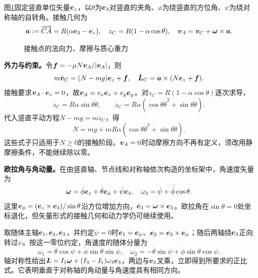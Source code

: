 \begin{solution}
图\ref{fig:hw6-8-s}固定竖直单位矢量$\bm{e}_z$，以$\theta$为$\bm{e}_3$对竖直的夹角、$\phi$为绕竖直的方位角、$\psi$为绕对称轴的自转角。接触几何为
\[
 \bm{a}:=\overrightarrow{CA}=R(\alpha\bm{e}_3-\bm{e}_z),\quad
 z_C=R(1-\alpha\cos\theta),\quad \bm{v}_A=\bm{v}_C+\bm{\omega}\times\bm{a}.
\]

\begin{figure}[H]\centering
{}
\caption{接触点的法向力、摩擦与质心重力}\label{fig:hw6-8-s}
\end{figure}

\textbf{外力与约束。}令$\bm{f}=-\mu N\bm{v}_A/|\bm{v}_A|$，则
\[
 m\dot{\bm{v}}_C=(N-mg)\bm{e}_z+\bm{f},\quad
 \dot{\bm{L}}_C=\bm{a}\times(N\bm{e}_z+\bm{f}).
\]
接触要求$\bm{v}_A\cdot\bm{e}_z=0$，故$\bm{v}_A=v_x\bm{e}_x+v_y\bm{e}_y$。对$z_C=R(1-\alpha\cos\theta)$逐次求导，
\[
\dot z_C=R\alpha\sin\theta\dot\theta,\qquad
\ddot z_C=R\alpha(\cos\theta\dot\theta^2+\sin\theta\ddot\theta).
\]
代入竖直平动方程$N-mg=m\ddot z_C$，得
\[
 N=mg+mR\alpha(\cos\theta\dot\theta^2+\sin\theta\ddot\theta).
\]
这些式子只适用于$N\ge0$的接触阶段。$\bm{v}_A=0$时动摩擦方向不再有定义，须改用静摩擦条件，不能继续除以零。

\textbf{欧拉角与角动量。}在由竖直轴、节点线和对称轴依次构造的坐标架中，角速度矢量为
\[
 \bm{\omega}=\dot\phi\bm{e}_z+\dot\theta\bm{e}_\phi+\dot\psi\bm{e}_3,
 \quad\omega_3=\dot\psi+\dot\phi\cos\theta.
\]
这里$\bm{e}_\phi=(\bm{e}_z\times\bm{e}_3)/\sin\theta$沿方位增加方向，$\dot{\bm{e}}_3=\bm{\omega}\times\bm{e}_3$。欧拉角在$\sin\theta=0$处坐标退化，但矢量形式的接触几何和动力学仍可继续使用。

取随体主轴$\bm{e}_1,\bm{e}_2,\bm{e}_3$，并约定$\psi=0$时$\bm{e}_1=\bm{e}_\phi$、$\bm{e}_2=\bm{e}_3\times\bm{e}_\phi$；随后两轴绕$\bm{e}_3$正向转过$\psi$。按这一零位约定，角速度的随体分量为
\[
 \omega_1=\dot\theta\cos\psi+\dot\phi\sin\theta\sin\psi,\quad
 \omega_2=-\dot\theta\sin\psi+\dot\phi\sin\theta\cos\psi.
\]
轴对称性给出$\bm{L}=I_1\bm{\omega}+(I_3-I_1)\omega_3\bm{e}_3$，两边与$\bm{e}_3$叉乘，立即得到所要求的正比式。它表明垂直于对称轴的角动量与角速度具有相同方向。


\end{solution}
